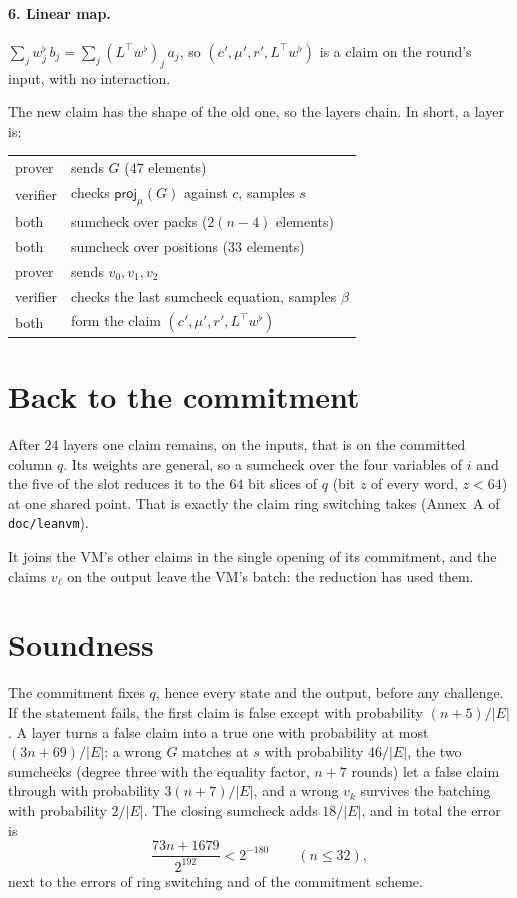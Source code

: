 \documentclass[11pt]{article}
\newcommand{\E}{E}
\newcommand{\proj}{\mathsf{proj}}
\begin{document}
\paragraph{6. Linear map.} $\sum_j w^\flat_j\, b_j = \sum_j (L^\top w^\flat)_j\, a_j$, so $(c', \mu', r', L^\top w^\flat)$ is a claim on the round's input, with no interaction.

The new claim has the shape of the old one, so the layers chain. In short, a layer is:

\begin{center}
\begin{tabular}{l@{\qquad}l}
prover & sends $G$ ($47$ elements) \\
verifier & checks $\proj_\mu(G)$ against $c$, samples $s$ \\
both & sumcheck over packs ($2(n-4)$ elements) \\
both & sumcheck over positions ($33$ elements) \\
prover & sends $v_0, v_1, v_2$ \\
verifier & checks the last sumcheck equation, samples $\beta$ \\
both & form the claim $(c', \mu', r', L^\top w^\flat)$
\end{tabular}
\end{center}

\section{Back to the commitment}\label{sec:openings}

After $24$ layers one claim remains, on the inputs, that is on the committed column $q$. Its weights are general, so a sumcheck over the four variables of $i$ and the five of the slot reduces it to the $64$ bit slices of $q$ (bit $z$ of every word, $z < 64$) at one shared point. That is exactly the claim ring switching takes (Annex~A of \texttt{doc/leanvm}).

It joins the VM's other claims in the single opening of its commitment, and the claims $v_\ell$ on the output leave the VM's batch: the reduction has used them.

\section{Soundness}

The commitment fixes $q$, hence every state and the output, before any challenge. If the statement fails, the first claim is false except with probability $(n + 5)/|\E|$. A layer turns a false claim into a true one with probability at most $(3n + 69)/|\E|$: a wrong $G$ matches at $s$ with probability $46/|\E|$, the two sumchecks (degree three with the equality factor, $n + 7$ rounds) let a false claim through with probability $3(n + 7)/|\E|$, and a wrong $v_k$ survives the batching with probability $2/|\E|$. The closing sumcheck adds $18/|\E|$, and in total the error is
\[
\frac{73n + 1679}{2^{192}} < 2^{-180} \qquad (n \le 32),
\]
next to the errors of ring switching and of the commitment scheme.
\end{document}
